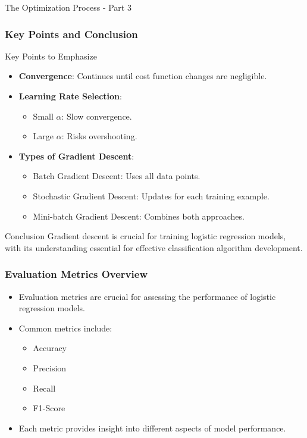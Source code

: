 \documentclass[aspectratio=169]{beamer}
\begin{document}
\begin{frame}[fragile]{The Optimization Process - Part 3}
    \frametitle{Key Points and Conclusion}

    \begin{block}{Key Points to Emphasize}
        \begin{itemize}
            \item \textbf{Convergence}: Continues until cost function changes are negligible.
            \item \textbf{Learning Rate Selection}:
            \begin{itemize}
                \item Small \( \alpha \): Slow convergence.
                \item Large \( \alpha \): Risks overshooting.
            \end{itemize}
            \item \textbf{Types of Gradient Descent}:
            \begin{itemize}
                \item Batch Gradient Descent: Uses all data points.
                \item Stochastic Gradient Descent: Updates for each training example.
                \item Mini-batch Gradient Descent: Combines both approaches.
            \end{itemize}
        \end{itemize}
    \end{block}
    
    \begin{block}{Conclusion}
        Gradient descent is crucial for training logistic regression models, with its understanding essential for effective classification algorithm development.
    \end{block}
\end{frame}

\begin{frame}[fragile]
    \frametitle{Evaluation Metrics Overview}
    \begin{itemize}
        \item Evaluation metrics are crucial for assessing the performance of logistic regression models.
        \item Common metrics include:
        \begin{itemize}
            \item Accuracy
            \item Precision
            \item Recall
            \item F1-Score
        \end{itemize}
        \item Each metric provides insight into different aspects of model performance.
    \end{itemize}
\end{frame}
\end{document}
